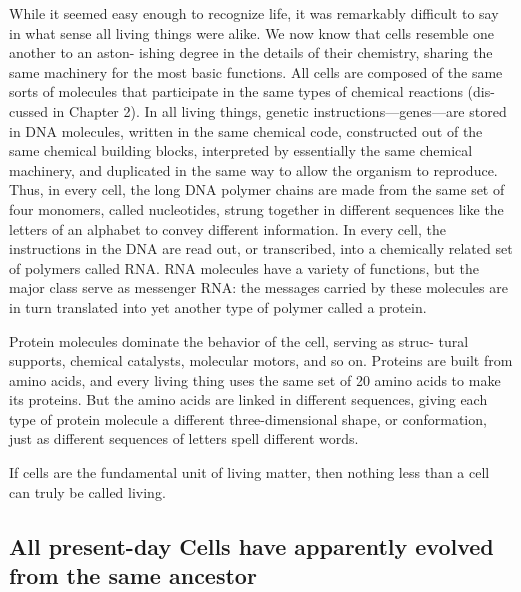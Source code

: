 While it seemed easy enough to recognize life, it was remarkably difficult to 
say in what sense all living things were alike.
We now know that cells resemble one another to an aston-
ishing degree in the details of their chemistry, sharing the same machinery
for the most basic functions. All cells are composed of the same sorts of
molecules that participate in the same types of chemical reactions (dis-
cussed in Chapter 2). In all living things, genetic instructions—genes—are
stored in DNA molecules, written in the same chemical code, constructed
out of the same chemical building blocks, interpreted by essentially the
same chemical machinery, and duplicated in the same way to allow the
organism to reproduce. Thus, in every cell, the long DNA polymer chains
are made from the same set of four monomers, called nucleotides, strung
together in different sequences like the letters of an alphabet to convey
different information. In every cell, the instructions in the DNA are read
out, or transcribed, into a chemically related set of polymers called RNA. 
RNA molecules have a variety of functions, but the major
class serve as messenger RNA: the messages carried by these molecules
are in turn translated into yet another type of polymer called a protein.

Protein molecules dominate the behavior of the cell, serving as struc-
tural supports, chemical catalysts, molecular motors, and so on. Proteins
are built from amino acids, and every living thing uses the same set of
20 amino acids to make its proteins. But the amino acids are linked in
different sequences, giving each type of protein molecule a different
three-dimensional shape, or conformation, just as different sequences
of letters spell different words.

If cells are the fundamental unit of living matter, then nothing less than a
cell can truly be called living.

\subsection{All present-day Cells have apparently evolved from the same ancestor}

